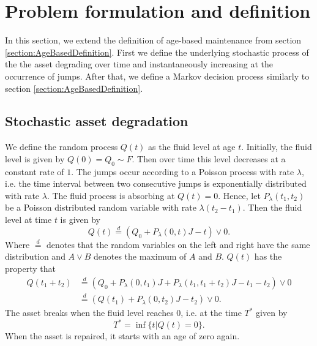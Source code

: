 \section{Problem formulation and definition}
In this section, we extend the definition of age-based maintenance from section \ref{section:AgeBasedDefinition}.
First we define the underlying stochastic process of the the asset degrading over time and instantaneously increasing at the occurrence of jumps.
After that, we define a Markov decision process similarly to section \ref{section:AgeBasedDefinition}.

\subsection{Stochastic asset degradation}
We define the random process $Q(t)$ as the fluid level at age $t$.
Initially, the fluid level is given by $Q(0)=Q_0\sim F$.
Then over time this level decreases at a constant rate of $1$.
The jumps occur according to a Poisson process with rate $\lambda$, i.e. the time interval between two consecutive jumps is exponentially distributed with rate $\lambda$.
The fluid process is absorbing at $Q(t)=0$.
Hence, let $P_\lambda(t_1,t_2)$ be a Poisson distributed random variable with rate $\lambda (t_2-t_1)$.
Then the fluid level at time $t$ is given by 
\[
Q(t)\stackrel d=(Q_0+P_\lambda(0,t)J-t)\vee 0.
\]
Where $\stackrel d=$ denotes that the random variables on the left and right have the same distribution and $A\vee B$ denotes the maximum of $A$ and $B$.
$Q(t)$ has the property that
\[
\begin{split}
Q(t_1+t_2)&\stackrel d=( Q_0+P_\lambda(0,t_1)J+P_\lambda(t_1,t_1+t_2)J-t_1-t_2)\vee0\\
&\stackrel d= (Q(t_1)+P_\lambda(0,t_2)J-t_2)\vee0.
\end{split}
\]
The asset breaks when the fluid level reaches $0$, i.e. at the time $T^*$ given by
\[
T^*=\inf\{t|Q(t)=0\}.
\]
When the asset is repaired, it starts with an age of zero again.

